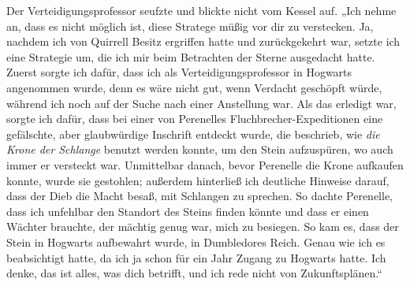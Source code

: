 Der Verteidigungsprofessor seufzte und blickte nicht vom Kessel auf.
„Ich nehme an, dass es nicht möglich ist, diese Stratege müßig vor dir zu verstecken. Ja, nachdem ich von Quirrell Besitz ergriffen hatte und zurückgekehrt war, setzte ich eine Strategie um, die ich mir beim Betrachten der Sterne ausgedacht hatte. Zuerst sorgte ich dafür, dass ich als Verteidigungsprofessor in Hogwarts angenommen wurde, denn es wäre nicht gut, wenn Verdacht geschöpft würde, während ich noch auf der Suche nach einer Anstellung war. Als das erledigt war, sorgte ich dafür, dass bei einer von Perenelles Fluchbrecher-Expeditionen eine gefälschte, aber glaubwürdige Inschrift entdeckt wurde, die beschrieb, wie \emph{die Krone der Schlange} benutzt werden konnte, um den Stein aufzuspüren, wo auch immer er versteckt war. Unmittelbar danach, bevor Perenelle die Krone aufkaufen konnte, wurde sie gestohlen; außerdem hinterließ ich deutliche Hinweise darauf, dass der Dieb die Macht besaß, mit Schlangen zu sprechen. So dachte Perenelle, dass ich unfehlbar den Standort des Steins finden könnte und dass er einen Wächter brauchte, der mächtig genug war, mich zu besiegen. So kam es, dass der Stein in Hogwarts aufbewahrt wurde, in Dumbledores Reich. Genau wie ich es beabsichtigt hatte, da ich ja schon für ein Jahr Zugang zu Hogwarts hatte. Ich denke, das ist alles, was dich betrifft, und ich rede nicht von Zukunftsplänen.“

